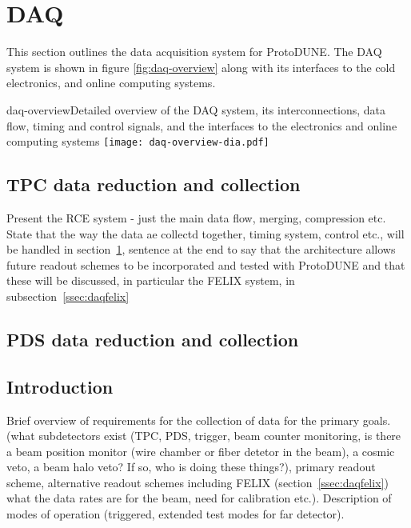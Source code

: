 \section{DAQ}
\label{sec:daq}


This section outlines the data acquisition system for ProtoDUNE.  The DAQ
system is shown in figure \ref{fig:daq-overview} along with its interfaces
to the cold electronics, and online computing systems.


\begin{cdrfigure}{daq-overview}{Detailed overview of the DAQ system, its interconnections, data flow, timing and control signals, and the interfaces to the electronics and online computing systems }
        \texttt{[image: daq-overview-dia.pdf]}
\end{cdrfigure}

\subsection{TPC data reduction and collection}

Present the RCE system - just the main data flow, merging, compression etc.  State that the way the data ae collectd together, timing system, control etc., will be handled in section~\ref{sec:daq}, sentence at the end to say that the architecture allows future readout schemes to be incorporated and tested with ProtoDUNE and that these will be discussed, in particular the FELIX system, in subsection~\ref{ssec:daqfelix} 

\subsection{PDS data reduction and collection}




\subsection{Introduction}

Brief overview of requirements for the collection of data for the primary goals.  (what subdetectors exist (TPC, PDS, trigger, beam counter monitoring, is there a beam position monitor (wire chamber or fiber detetor in the beam), a cosmic veto, a beam halo veto?  If so, who is doing these things?), primary readout scheme, alternative readout schemes including FELIX (section~\ref{ssec:daqfelix}) what the data rates are for the beam, need for calibration etc.).  Description of modes of operation (triggered, extended test modes for far detector).

